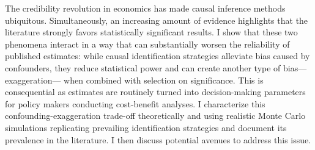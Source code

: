 The credibility revolution in economics has made causal inference methods ubiquitous. Simultaneously, an increasing amount of evidence highlights that the literature strongly favors statistically significant results. I show that these two phenomena interact in a way that can substantially worsen the reliability of published estimates: while causal identification strategies alleviate bias caused by confounders, they reduce statistical power and can create another type of bias---exaggeration--- when combined with selection on significance. This is consequential as estimates are routinely turned into decision-making parameters for policy makers conducting cost-benefit analyses. I characterize this confounding-exaggeration trade-off theoretically and using realistic Monte Carlo simulations replicating prevailing identification strategies and document its prevalence in the literature. I then discuss potential avenues to address this issue.